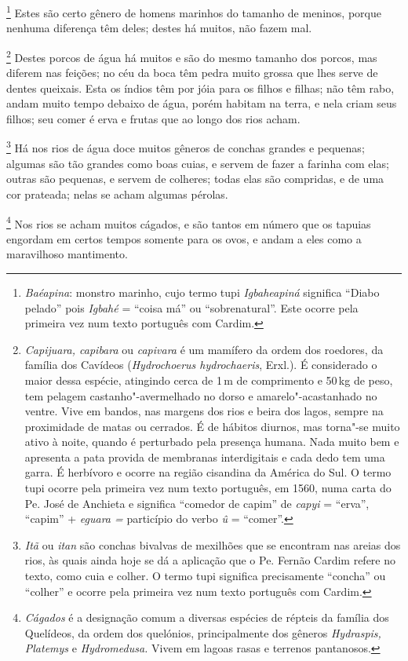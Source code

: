 \begin{linenumbers}
\footnote{ \textit{Baéapina}: monstro marinho, cujo
termo tupi \textit{Igbaheapiná} significa ``Diabo pelado'' pois
\textit{Igbahé} = ``coisa má'' ou ``sobrenatural''. Este ocorre pela
primeira vez num texto português com Cardim.} Estes são
certo gênero de homens marinhos do tamanho de meninos, porque nenhuma
diferença têm deles; destes há muitos, não fazem mal.

\footnote{ \textit{Capijuara, capibara} ou
\textit{capivara} é um mamífero da ordem dos roedores, da família
dos Cavídeos (\textit{Hydrochoerus hydrochaeris}, Erxl.). É
considerado o maior dessa espécie, atingindo cerca de 1\,m de comprimento
e 50\,kg de peso, tem pelagem castanho"-avermelhado no dorso e
amarelo"-acastanhado no ventre. Vive em bandos, nas margens dos rios e
beira dos lagos, sempre na proximidade de matas ou cerrados. É de
hábitos diurnos, mas torna"-se muito ativo à noite, quando é perturbado
pela presença humana. Nada muito bem e apresenta a pata provida de
membranas interdigitais e cada dedo tem uma garra. É herbívoro e ocorre
na região cisandina da América do Sul. O termo tupi ocorre pela
primeira vez num texto português, em 1560, numa carta do Pe.
José de Anchieta e significa ``comedor de capim'' de \textit{capyi} = 
``erva'', ``capim'' + \textit{eguara =} particípio do verbo \textit{û} = 
``comer''.} Destes porcos de água há muitos e são do mesmo
tamanho dos porcos, mas diferem nas feições; no céu da boca têm pedra
muito grossa que lhes serve de dentes queixais. Esta os índios têm por
jóia para os filhos e filhas; não têm rabo, andam muito tempo debaixo
de água, porém habitam na terra, e nela criam seus filhos; seu comer é
erva e frutas que ao longo dos rios acham.

\footnote{ \textit{Itã} ou \textit{itan} são conchas
bivalvas de mexilhões que se encontram nas areias dos rios, às quais
ainda hoje se dá a aplicação que o Pe. Fernão Cardim refere no texto,
como cuia e colher. O termo tupi significa precisamente ``concha'' ou
``colher'' e ocorre pela primeira vez num texto português com
Cardim.} Há nos rios de água doce muitos gêneros de conchas
grandes e pequenas; algumas são tão grandes como boas cuias, e servem
de fazer a farinha com elas; outras são pequenas, e servem de colheres;
todas elas são compridas, e de uma cor prateada; nelas se acham algumas pérolas.

\footnote{ \textit{Cágados} é a designação comum a
diversas espécies de répteis da família dos Quelídeos, da ordem dos
quelónios, principalmente dos gêneros \textit{Hydraspis, Platemys} e 
\textit{Hydromedusa.} Vivem em lagoas rasas e terrenos pantanosos.}
 Nos rios se acham muitos cágados, e são tantos em número
que os tapuias engordam em certos tempos somente para os ovos, e andam
a eles como a maravilhoso mantimento.


\end{linenumbers}
